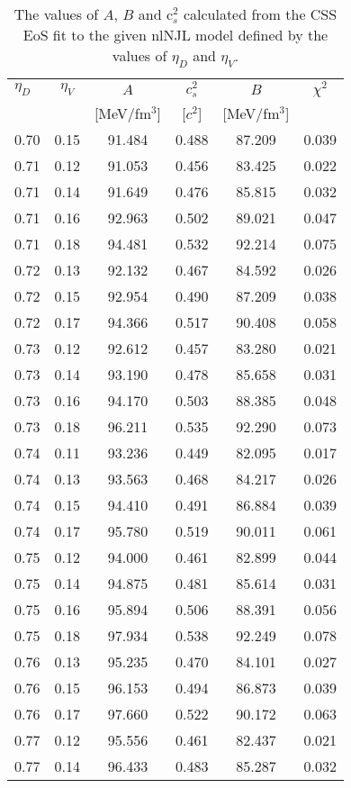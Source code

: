 \documentclass[%
 reprint,
superscriptaddress,
nofootinbib,
 amsmath,amssymb,
 aps,
]{revtex4-1}
\begin{document}
\begin{table} [t]
\caption{\label{tab:Fit_34}
 The values of $A$, $B$ and c$_s^2$ calculated from the CSS EoS fit to the given nlNJL model defined by the values of $\eta_D$ and $\eta_V$.}
\begin{ruledtabular}
\begin{tabular}{lccccc}
$\eta_D$ & $\eta_V$ & $A$ &  $c_s^2$ & $B$ & $\chi^2$ \\
&   & [MeV/fm$^{3}$] & [$c^2$] & [MeV/fm$^{3}$] & \\
\hline
0.70&	0.15&	91.484&	0.488&	87.209&	0.039\\ 
0.71&	0.12&	91.053&	0.456&	83.425&	0.022\\
0.71&	0.14&	91.649&	0.476&	85.815&	0.032\\
0.71&	0.16&	92.963&	0.502&	89.021&	0.047\\
0.71&	0.18&	94.481&	0.532&	92.214&	0.075\\
0.72&	0.13&	92.132&	0.467&	84.592&	0.026\\ 
0.72&	0.15&	92.954&	0.490&	87.209&	0.038\\ 
0.72&	0.17&	94.366&	0.517&	90.408&	0.058\\
0.73&	0.12&	92.612&	0.457&	83.280&	0.021\\
0.73&	0.14&	93.190&	0.478&	85.658&	0.031\\
0.73&	0.16&	94.170&	0.503&	88.385&	0.048\\
0.73&	0.18&	96.211&	0.535&	92.290&	0.073\\
0.74&	0.11&	93.236&	0.449&	82.095&	0.017\\
0.74&	0.13&	93.563&	0.468&	84.217&	0.026\\
0.74&	0.15&	94.410&	0.491&	86.884&	0.039\\
0.74&	0.17&	95.780&	0.519&	90.011&	0.061\\
0.75&	0.12&	94.000&	0.461&	82.899&	0.044\\
0.75&	0.14&	94.875&	0.481&	85.614&	0.031\\
0.75&	0.16&	95.894&	0.506&	88.391&	0.056\\
0.75&	0.18&	97.934&	0.538&	92.249&	0.078\\
0.76&	0.13&	95.235&	0.470&	84.101&	0.027\\
0.76&	0.15&	96.153&	0.494&	86.873&	0.039\\
0.76&	0.17&	97.660&	0.522&	90.172&	0.063\\
0.77&	0.12&	95.556&	0.461&	82.437&	0.021\\
0.77&	0.14&	96.433&	0.483&	85.287&	0.032\\

\end{tabular}
\end{ruledtabular}
\end{table}
\end{document}
